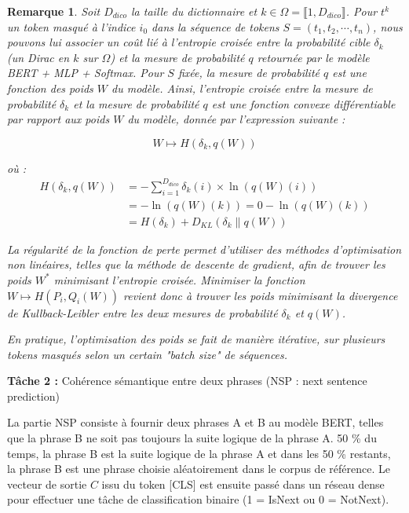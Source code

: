 \documentclass[12pt]{article}
\newtheorem{rmq}{Remarque}
\theoremstyle{definition}
\begin{document}
\begin{rmq}
	Soit $D_{dico}$ la taille du dictionnaire et $k \in \Omega = \llbracket1,D_{dico}\rrbracket$. Pour $t^k$ un token masqué à l'indice $i_0$ dans la séquence de tokens $S = (t_1, t_2, \cdots, t_n)$, nous pouvons lui associer un coût lié à l’entropie croisée entre la probabilité cible $\delta_k$ (un Dirac en $k$ sur $\Omega$) et la mesure de probabilité $q$ retournée par le modèle BERT + MLP + Softmax. Pour $S$ fixée, la mesure de probabilité $q$ est une fonction des poids $W$ du modèle. Ainsi, l’entropie croisée entre la mesure de probabilité $\delta_k$ et la mesure de probabilité $q$ est une fonction convexe différentiable par rapport aux poids $W$ du modèle, donnée par l'expression suivante :
	
	$$W \longmapsto H(\delta_k, q(W))$$
	
	où :
	\begin{align*}
		H(\delta_k, q(W)) &= - \sum_{i=1}^{D_{dico}} \delta_k(i) \times \ln(q(W)(i))\\
		&= -\ln(q(W)(k)) = 0 -\ln(q(W)(k))  \\
		&= H(\delta_k) + D_{KL}\left(\delta_k \| q(W)\right)
	\end{align*}
	
	La régularité de la fonction de perte permet d’utiliser des méthodes d’optimisation non linéaires, telles que la méthode de descente de gradient, afin de trouver les poids $W^*$ minimisant l'entropie croisée. Minimiser la fonction $W \mapsto H(P_i, Q_i(W))$ revient donc à trouver les poids minimisant la divergence de Kullback-Leibler entre les deux mesures de probabilité $\delta_k$ et $q(W)$. 
	
	En pratique, l'optimisation des poids se fait de manière itérative, sur plusieurs tokens masqués selon un certain "batch size" de séquences.
\end{rmq}

\textbf{Tâche 2 :} Cohérence sémantique entre deux phrases (NSP : next sentence prediction)

La partie NSP consiste à fournir deux phrases A et B au modèle BERT, telles que la phrase B ne soit pas toujours la suite logique de la phrase A. 50 \% du temps, la phrase B est la suite logique de la phrase A et dans les 50 \% restants, la phrase B est une phrase choisie aléatoirement dans le corpus de référence. Le vecteur de sortie $C$ issu du token [CLS] est ensuite passé dans un réseau dense pour effectuer une tâche de classification binaire (1 = IsNext ou 0 = NotNext).
\end{document}
